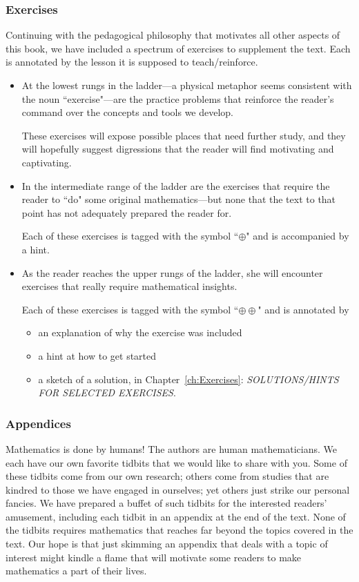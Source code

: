 \subsubsection{Exercises}

Continuing with the pedagogical philosophy that motivates all other aspects of this book, we have included a spectrum of exercises to supplement the text.  Each is annotated by the lesson it is supposed to teach/reinforce.
\begin{itemize}
\item
At the lowest rungs in the ladder---a physical metaphor seems consistent with the noun ``exercise"---are the practice problems that reinforce the reader's command over the concepts and tools we develop.

These exercises will expose possible places that need further study, and they will hopefully suggest digressions that the reader will find motivating and captivating.

\item
In the intermediate range of the ladder are the exercises that require the reader to ``do" some original mathematics---but none that the text to that point has not adequately prepared the reader for. 

Each of these exercises is tagged with the symbol ``$\oplus$" and is accompanied by a hint.

\item
As the reader reaches the upper rungs of the ladder, she will encounter exercises that really require mathematical insights.

Each of these exercises is tagged with the symbol ``$\oplus \oplus$" and is annotated by
  \begin{itemize}
  \item
an explanation of why the exercise was included
  \item
a hint at how to get started
  \item
a sketch of a solution, in Chapter~\ref{ch:Exercises}: {\it SOLUTIONS/HINTS FOR SELECTED EXERCISES}.
  \end{itemize}  
\end{itemize}

\subsubsection{Appendices}

Mathematics is done by humans!  The authors are human mathematicians.  We each have our own favorite tidbits that we would like to share with you.  Some of these tidbits come from our own research; others come from studies that are kindred to those we have engaged in ourselves; yet others just strike our personal fancies.  We have prepared a buffet of such tidbits for the interested readers' amusement, including each tidbit in an appendix at the end of the text.  None of the tidbits requires mathematics that reaches far beyond the topics covered in the text.  Our hope is that just skimming an appendix that deals with a topic of interest might kindle a flame that will motivate some readers to make mathematics a part of their lives.


